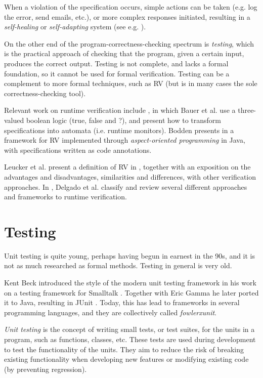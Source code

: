 \documentclass[a4paper,11pt]{kth-mag}
\begin{document}
When a violation of the specification occurs, simple actions can be taken (e.g. log the error, send emails, etc.), or more complex responses initiated, resulting in a \textit{self-healing} or \textit{self-adapting} system (see e.g. \cite{huebscher08}).

On the other end of the program-correctness-checking spectrum is \emph{testing}, which is the
practical approach of checking that the program, given a certain input, produces the correct output.
Testing is not complete, and lacks a formal foundation, so it cannot be used for formal verification. 
Testing can be a complement to more formal techniques, such as RV (but is in many cases the sole correctness-checking tool).

Relevant work on runtime verification include \cite{bauer06}, in which Bauer et al. use a three-valued boolean logic (true, false and ?), and present how to transform specifications into automata (i.e. runtime monitors). Bodden presents in \cite{bodden05efficientrv} a framework for RV implemented through \emph{aspect-oriented programming} \cite{aspectj} in Java, with specifications written
as code annotations.

Leucker et al. present a definition of RV in \cite{leucker09abriefaccount}, together with an exposition on the advantages and disadvantages, similarities and differences, with other verification approaches. In \cite{delgado04taxonomy}, Delgado et al. classify and review several different approaches and frameworks to runtime verification.


\section{Testing}

Unit testing is quite young, perhaps having begun in earnest in the 90s, and it is not as much researched as formal methods. Testing in general is very old.

Kent Beck introduced the style of the modern unit testing framework in his
work on a testing framework  for Smalltalk \cite{becksmalltalktesting}. 
Together with Eric Gamma he later ported it to Java, resulting in JUnit \cite{junit}. Today, this has lead to frameworks in several programming languages, and they are collectively called \textit{fowlerxunit}.


\textit{Unit testing} is the concept of writing small tests, or test suites, for the units in
a program, such as functions, classes, etc. These tests are used during development to test the 
functionality of the units. They aim to reduce the risk of breaking existing functionality when 
developing new features or modifying existing code (by preventing regression).
\end{document}
